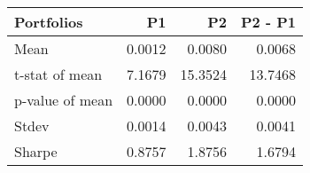 \begin{tabular}{lrrr}
\toprule
Portfolios & P1 & P2 & P2 - P1 \\
\midrule
Mean & 0.0012 & 0.0080 & 0.0068 \\
t-stat of mean & 7.1679 & 15.3524 & 13.7468 \\
p-value of mean & 0.0000 & 0.0000 & 0.0000 \\
Stdev & 0.0014 & 0.0043 & 0.0041 \\
Sharpe & 0.8757 & 1.8756 & 1.6794 \\
\bottomrule
\end{tabular}
